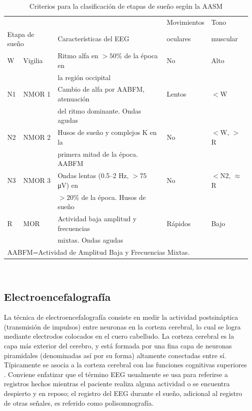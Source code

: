 \documentclass[12pt,letterpaper]{book}
\newcommand{\hz}{\si{\hertz}\xspace}
\newcommand{\mv}{\si{\micro\volt}\xspace}
\begin{document}
\begin{table}
\label{cuadro:aasm}
\caption[Criterios para la clasificación de etapas de sueño]
{Criterios para la clasificación de etapas de sueño según la AASM}
\centering
{\small
\begin{tabular}{lllll}
\toprule
&&   & Movimientos & Tono \\
\multicolumn{2}{l}{Etapa de sueño}& Características del EEG & oculares & muscular \\
\midrule
 W  & Vigilia & {Ritmo alfa} en $>50$\% de la época en   & No & Alto \\
    &         & la región occipital                &    &      \\
 N1 & NMOR 1  & Cambio de alfa por AABFM, atenuación & Lentos & $<$W     \\
    &         & del ritmo dominante. Ondas agudas   &    &      \\
 N2 & NMOR 2  & Husos de sueño y complejos K en la    & No & $<$W, $>$R     \\
    &         & primera mitad de la época. AABFM &    &     \\
 N3 & NMOR 3  & {Ondas lentas} (0.5--2 \hz, $>75$ \mv) en& No & $<$N2, $\approx$R \\
    &         & $>20$\% de la época. Husos de sueño       &&      \\
 R  & MOR     & Actividad baja amplitud y frecuencias & Rápidos & Bajo  \\
    &         & mixtas. Ondas agudas             &       &       \\
\bottomrule
\multicolumn{4}{l}{AABFM=Actividad de Amplitud Baja y Frecuencias Mixtas.}
\end{tabular}\\
}
\end{table}


\subsection{Electroencefalografía}
\label{sec:eeg}

La técnica de electroencefalografía consiste en medir la actividad postsináptica (transmisión de impulsos) entre neuronas en la corteza cerebral, lo cual se logra mediante electrodos colocados en el cuero cabelludo.
%
La corteza cerebral es la capa más exterior del cerebro, y está formada por una fina capa de neuronas piramidales (denominadas así por su forma) altamente conectadas entre sí.
%
Típicamente se asocia a la corteza cerebral con las funciones cognitivas superiores \cite{niedermeyer}.
%
Conviene enfatizar que el término EEG usualmente se usa para referirse a registros hechos mientras el paciente realiza alguna actividad o se encuentra despierto y en reposo; el registro del EEG durante el sueño, adicional al registro de otras señales, es referido como polisomnografía.
\end{document}
